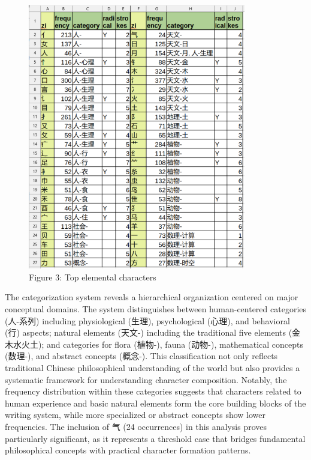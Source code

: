 \documentclass[
  11pt,
  letterpaper,
]{article}
\begin{document}
\begin{figure}
\centering
\includegraphics[width=0.85\textwidth]{./images/top-elemental-zi-ENU.png}
\caption{Figure 3: Top elemental characters}
\end{figure}

The categorization system reveals a hierarchical organization centered
on major conceptual domains. The system distinguishes between
human-centered categories (人-系列) including physiological (生理),
psychological (心理), and behavioral (行) aspects; natural elements
(天文-) including the traditional five elements (金木水火土); and
categories for flora (植物-), fauna (动物-), mathematical concepts
(数理-), and abstract concepts (概念-). This classification not only
reflects traditional Chinese philosophical understanding of the world
but also provides a systematic framework for understanding character
composition. Notably, the frequency distribution within these categories
suggests that characters related to human experience and basic natural
elements form the core building blocks of the writing system, while more
specialized or abstract concepts show lower frequencies. The inclusion
of 气 (24 occurrences) in this analysis proves particularly significant,
as it represents a threshold case that bridges fundamental philosophical
concepts with practical character formation patterns.
\end{document}
